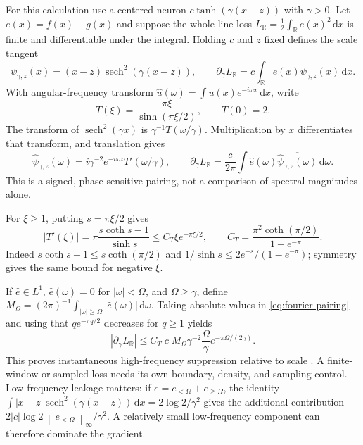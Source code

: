 \documentclass[11pt]{article}
\newcommand{\R}{\mathbb R}
\newcommand{\norm}[1]{\left\lVert#1\right\rVert}
\newcommand{\sech}{\operatorname{sech}}
\newcommand{\dd}{\,\mathrm d}
\begin{document}
For this calculation use a centered neuron $c\tanh(\gamma(x-z))$ with $\gamma>0$. Let $e(x)=f(x)-g(x)$ and suppose the whole-line loss $L_{\R}=\frac12\int_{\R}e(x)^2\dd x$ is finite and differentiable under the integral. Holding $c$ and $z$ fixed defines the scale tangent
\begin{equation}
 \psi_{\gamma,z}(x)=(x-z)\sech^2(\gamma(x-z)),\qquad
 \partial_\gamma L_{\R}=c\int_{\R}e(x)\psi_{\gamma,z}(x)\dd x.
\end{equation}
With angular-frequency transform $\widehat u(\omega)=\int u(x)e^{-i\omega x}\dd x$, write
\begin{equation}
 T(\xi)=\frac{\pi\xi}{\sinh(\pi\xi/2)},\qquad T(0)=2.
\end{equation}
The transform of $\sech^2(\gamma x)$ is $\gamma^{-1}T(\omega/\gamma)$. Multiplication by $x$ differentiates that transform, and translation gives
\begin{equation}
 \widehat\psi_{\gamma,z}(\omega)
 =i\gamma^{-2}e^{-i\omega z}T'(\omega/\gamma),\qquad
 \partial_\gamma L_{\R}
 =\frac{c}{2\pi}\int\widehat e(\omega)
           \overline{\widehat\psi_{\gamma,z}(\omega)}\dd\omega.
 \label{eq:fourier-pairing}
\end{equation}
This is a signed, phase-sensitive pairing, not a comparison of spectral magnitudes alone.

For $\xi\geq1$, putting $s=\pi\xi/2$ gives
\begin{equation}
 |T'(\xi)|=\pi\frac{s\coth s-1}{\sinh s}
 \leq C_T\xi e^{-\pi\xi/2},\qquad
 C_T=\frac{\pi^2\coth(\pi/2)}{1-e^{-\pi}}.
\end{equation}
Indeed $s\coth s-1\leq s\coth(\pi/2)$ and
$1/\sinh s\leq2e^{-s}/(1-e^{-\pi})$; symmetry gives the same bound for negative $\xi$.

If $\widehat e\in L^1$, $\widehat e(\omega)=0$ for $|\omega|<\Omega$, and $\Omega\geq\gamma$, define
$M_\Omega=(2\pi)^{-1}\int_{|\omega|\geq\Omega}|\widehat e(\omega)|\dd\omega$.
Taking absolute values in \eqref{eq:fourier-pairing} and using that $q e^{-\pi q/2}$ decreases for $q\geq1$ yields
\begin{equation}
 \boxed{|\partial_\gamma L_{\R}|
 \leq C_T|c|M_\Omega\gamma^{-2}
       \frac{\Omega}{\gamma}e^{-\pi\Omega/(2\gamma)}.}
 \label{eq:fourier-bound}
\end{equation}
This proves instantaneous high-frequency suppression relative to scale \cite{handoff}. A finite-window or sampled loss needs its own boundary, density, and sampling control. Low-frequency leakage matters: if $e=e_{<\Omega}+e_{\geq\Omega}$, the identity
$\int|x-z|\sech^2(\gamma(x-z))\dd x=2\log2/\gamma^2$ gives the additional contribution
$2|c|\log2\,\norm{e_{<\Omega}}_\infty/\gamma^2$. A relatively small low-frequency component can therefore dominate the gradient.
\end{document}
